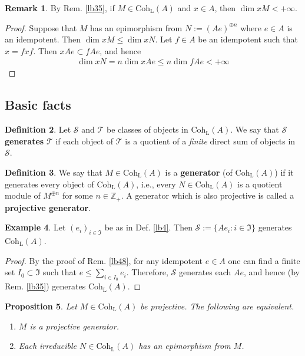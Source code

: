 \documentclass[11pt,b5paper,notitlepage]{article}
\theoremstyle{definition}
\newtheorem{df}{Definition}[section]
\newtheorem{eg}[df]{Example}
\newtheorem{rem}[df]{Remark}
\theoremstyle{plain}
\newtheorem{pp}[df]{Proposition}
\newcommand{\fk}{\mathfrak}
\newcommand{\scr}{\mathscr}
\newcommand{\Zbb}{\mathbb Z}
\newcommand{\Coh}{\mathrm{Coh}_{\mathrm L}}
\numberwithin{equation}{section}
\begin{document}
\begin{rem}\label{lb56}
By Rem. \ref{lb35}, if $M\in\Coh(A)$ and $x\in A$, then $\dim xM<+\infty$.
\end{rem}

\begin{proof}
Suppose that $M$ has an epimorphism from $N:=(Ae)^{\oplus n}$ where $e\in A$ is an idempotent. Then $\dim xM\leq \dim xN$. Let $f\in A$ be an idempotent such that $x=fxf$. Then $xAe\subset fAe$, and hence
\begin{align*}
\dim xN=n\dim xAe\leq n\dim fAe<+\infty
\end{align*} 
\end{proof}



\subsection{Basic facts}

\begin{df}
Let $\scr S$ and $\scr T$ be classes of objects in $\Coh(A)$. We say that $\scr S$ \textbf{generates} $\scr T$ if each object of $\scr T$ is a quotient of a \textit{finite} direct sum of objects in $\scr S$.
\end{df}


\begin{df}
We say that $M\in\Coh(A)$ is a \textbf{generator} (of $\Coh(A)$) if it generates every object of $\Coh(A)$, i.e., every $N\in\Coh(A)$ is a quotient module of $M^{\oplus n}$ for some $n\in\Zbb_+$. A generator which is also projective is called a \textbf{projective generator}.
\end{df}


\begin{eg}\label{lb34}
Let $(e_i)_{i\in\fk I}$ be as in Def. \ref{lb4}. Then $\scr S:=\{Ae_i:i\in\fk I\}$ generates $\Coh(A)$.
\end{eg}

\begin{proof}
By the proof of Rem. \ref{lb48}, for any idempotent $e\in A$ one can find a finite set $I_0\subset \mathfrak I$ such that $e\leq\sum_{i\in I_0} e_i$. Therefore, $\scr S$ generates each $Ae$, and hence (by Rem. \ref{lb35}) generates $\Coh(A)$.
\end{proof}


\begin{pp}\label{lb27}
Let $M\in\Coh(A)$ be projective. The following are equivalent.
\begin{enumerate}[label=(\arabic*)]
\item $M$ is a projective generator.
\item Each irreducible $N\in\Coh(A)$ has an epimorphism from $M$.
\end{enumerate}
\end{pp}
\end{document}
